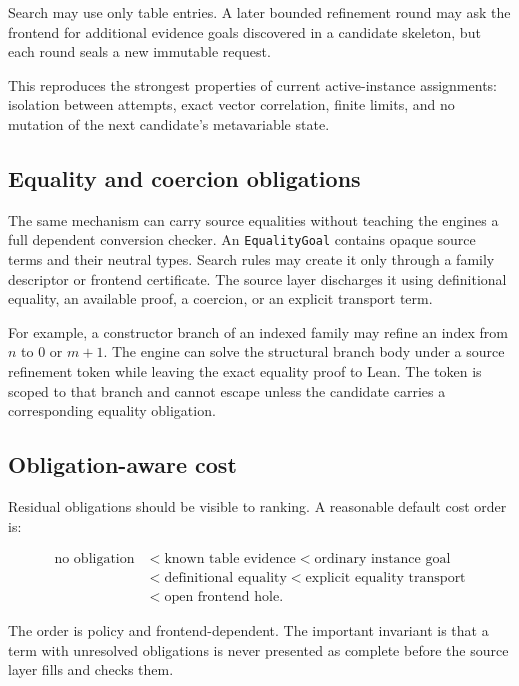 \documentclass[11pt]{article}
\newcommand{\code}[1]{\texttt{#1}}
\begin{document}
Search may use only table entries.  A later bounded refinement round may ask the
frontend for additional evidence goals discovered in a candidate skeleton,
but each round seals a new immutable request.

This reproduces the strongest properties of current active-instance
assignments: isolation between attempts, exact vector correlation, finite
limits, and no mutation of the next candidate's metavariable state.

\subsection{Equality and coercion obligations}

The same mechanism can carry source equalities without teaching the engines a
full dependent conversion checker.  An \code{EqualityGoal} contains opaque
source terms and their neutral types.  Search rules may create it only through
a family descriptor or frontend certificate.  The source layer discharges it
using definitional equality, an available proof, a coercion, or an explicit
transport term.

For example, a constructor branch of an indexed family may refine an index
from \(n\) to \(0\) or \(m+1\).  The engine can solve the structural branch
body under a source refinement token while leaving the exact equality proof to
Lean.  The token is scoped to that branch and cannot escape unless the
candidate carries a corresponding equality obligation.

\subsection{Obligation-aware cost}

Residual obligations should be visible to ranking.  A reasonable default cost
order is:

\[
\begin{aligned}
\text{no obligation}
&< \text{known table evidence}
 < \text{ordinary instance goal}\\
&< \text{definitional equality}
 < \text{explicit equality transport}\\
&< \text{open frontend hole}.
\end{aligned}
\]

The order is policy and frontend-dependent.  The important invariant is that a
term with unresolved obligations is never presented as complete before the
source layer fills and checks them.
\end{document}
